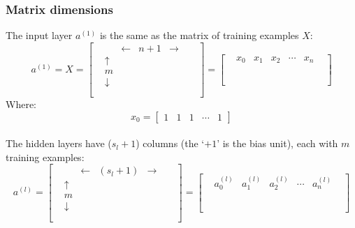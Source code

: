 \documentclass[12pt]{article}
\begin{document}
\subsubsection{Matrix dimensions}
The input layer $a^{(1)}$ is the same as the matrix of training examples $X$:
\begin{equation}
a^{(1)}=X=\begin{bmatrix}
& & \leftarrow & n+1 & \rightarrow & &\\
& \uparrow & & & & & \\
& m & & & & & \\
& \downarrow & & & & & \\
& & & & & & \\
\end{bmatrix} = \begin{bmatrix}
& x_0 & x_1 & x_2 & \cdots & x_n &\\
& & & & & \\
& & & & & \\
& & & & & \\
& & & & & \\
\end{bmatrix}
\end{equation}
Where: \begin{equation}
x_0=\begin{bmatrix}
1 & 1 & 1 & \cdots & 1
\end{bmatrix}
\end{equation}\\
The hidden layers have ($s_{l}+1$) columns (the `$+1$' is the bias unit), each with $m$ training examples:
\begin{equation}
a^{(l)}=\begin{bmatrix}
& & \leftarrow & (s_{l}+1) & \rightarrow & &\\
& \uparrow & & & & & \\
& m & & & & & \\
& \downarrow & & & & & \\
& & & & & & \\
\end{bmatrix} = \begin{bmatrix}
& a_0^{(l)} & a_1^{(l)} & a_2^{(l)} & \cdots & a_n^{(l)} &\\
& & & & & \\
& & & & & \\
& & & & & \\
& & & & & \\
\end{bmatrix}
\end{equation}
\end{document}
